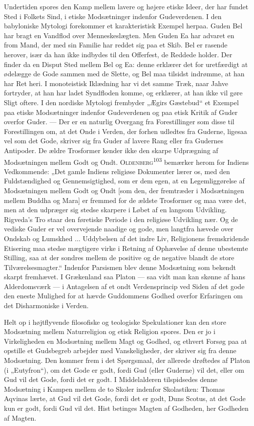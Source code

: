 \documentclass[12pt,a4paper,openany]{book}
\newcommand{\opage}[1]{\marginnote{\footnotesize\textit{[#1]}}}
\begin{document}
Undertiden spores den Kamp mellem lavere og højere etiske Ideer, der har
fundet Sted i Folkets Sind, i etiske Modsætninger indenfor Gudeverdenen.
I den babyloniske Mytologi forekommer et karakteristisk Exempel herpaa.
Guden Bel har bragt en Vandflod over Menneskeslægten. Men Guden Ea har
advaret en from Mand, der med sin Familie har reddet sig paa et Skib.
Bel er rasende herover, især da han ikke indbydes til den Offerfest, de
Reddede holder. Der finder da en Disput Sted mellem Bel og Ea: denne
erklærer det for uretfærdigt at ødelægge de Gode sammen med de Slette,
og Bel maa tilsidst indrømme, at han har Ret heri. I monoteistisk
Iklædning har vi det samme Træk, naar Jahve fortryder, at han har ladet
Syndfloden komme, og erklærer, at han ikke vil gøre Sligt oftere. I den
nordiske Mytologi frembyder „Ægirs Gæstebud“ et Exempel paa etiske
Modsætninger indenfor Gudeverdenen og paa etisk Kritik af Guder overfor
Guder. --- Der er en naturlig Overgang fra Forestillinger som disse til
Forestillingen om, at det Onde i Verden, der forhen udledtes fra
Guderne, ligesaa vel som det Gode, skriver sig fra Guder af lavere Rang
eller fra Gudernes Antipoder. De ældre Trosformer kender ikke den skarpe
Udprægning af Modsætningen mellem Godt og Ondt.
\textsc{Oldenberg}\textsuperscript{103} bemærker herom for Indiens
Vedkommende: „Det gamle Indiens religiøse Dokumenter lærer os, med den
Fuldstændighed og Gennemsigtighed, som er dem egen, at en
Legemliggørelse af Modsætningen mellem Godt og Ondt [som den, der
fremtræder i Modsætningen mellem Buddha og Mara] er fremmed for de
ældste Trosformer og maa være det, men at den udpræger sig stedse
skarpere i Løbet af en langsom Udvikling. Rigveda’s Tro staar den
føretiske Periode i den religiøse Udvikling nær. Og de vediske Guder er
vel overvejende naadige og gode, men langtfra hævede over Ondskab og
Lumskhed ... Uddybelsen af det indre Liv, Religionens fremskridende
Etisering maa stedse mægtigere virke i Retning af Ophævelse
\opage{214}af denne ubestemte Stilling, saa at der sondres mellem de
positive og de negative blandt de store Tilværelsesmagter.“ Indenfor
Parsismen blev denne Modsætning som bekendt skarpt fremhævet. I
Grækenland saa Platon --- saa vidt man kan skønne af hans Alderdomsværk
--- i Antagelsen af et ondt Verdensprincip ved Siden af det gode den
eneste Mulighed for at hævde Guddommens Godhed overfor Erfaringen om det
Disharmoniske i Verden.

Helt op i højtflyvende filosofiske og teologiske Spekulationer kan den
store Modsætning mellem Naturreligion og etisk Religion spores. Den er
jo i Virkeligheden en Modsætning mellem Magt og Godhed, og ethvert
Forsøg paa at opstille et Gudsbegreb arbejder med Vanskeligheder, der
skriver sig fra denne Modsætning. Den kommer frem i det Spørgsmaal, der
allerede drøftedes af Platon (i „Eutyfron“), om det Gode er godt, fordi
Gud (eller Guderne) vil det, eller om Gud vil det Gode, fordi det er
godt. I Middelalderen tilspidsedes denne Modsætning i Kampen mellem de
to Skoler indenfor Skolastiken: Thomas Aqvinas lærte, at Gud vil det
Gode, fordi det er godt, Duns Scotus, at det Gode kun er godt, fordi Gud
vil det. Hist betinges Magten af Godheden, her Godheden af Magten.
\end{document}
